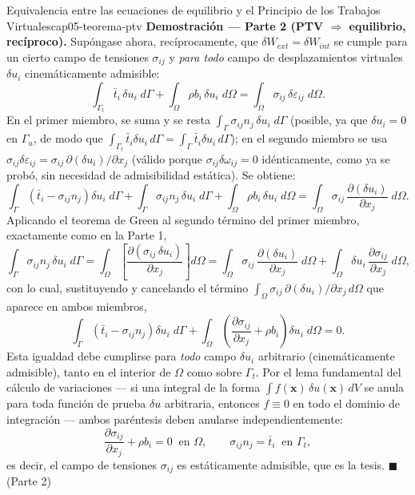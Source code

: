 \begin{teorema}{Equivalencia entre las ecuaciones de equilibrio y el Principio de los Trabajos Virtuales}{cap05-teorema-ptv}
\medskip
\textbf{Demostración --- Parte 2 (PTV $\Rightarrow$ equilibrio, recíproco).}
Supóngase ahora, recíprocamente, que $\delta W_{ext}=\delta W_{int}$ se cumple para un cierto campo de tensiones $\sigma_{ij}$ y \emph{para todo} campo de desplazamientos virtuales $\delta u_i$ cinemáticamente admisible:
\[
\int_{\Gamma_t}\bar t_i\,\delta u_i\;d\Gamma + \int_\Omega \rho b_i\,\delta u_i\;d\Omega = \int_\Omega \sigma_{ij}\,\delta\varepsilon_{ij}\;d\Omega .
\]
En el primer miembro, se suma y se resta $\displaystyle\int_\Gamma \sigma_{ij}n_j\,\delta u_i\;d\Gamma$ (posible, ya que $\delta u_i=0$ en $\Gamma_u$, de modo que $\int_{\Gamma_t}\bar t_i \delta u_i\, d\Gamma = \int_\Gamma \bar t_i \delta u_i\, d\Gamma$); en el segundo miembro se usa $\sigma_{ij}\delta\varepsilon_{ij} = \sigma_{ij}\,\partial(\delta u_i)/\partial x_j$ (válido porque $\sigma_{ij}\delta\omega_{ij}=0$ idénticamente, como ya se probó, sin necesidad de admisibilidad estática). Se obtiene:
\[
\int_\Gamma \left(\bar t_i - \sigma_{ij}n_j\right)\delta u_i\;d\Gamma + \int_\Gamma \sigma_{ij}n_j\,\delta u_i\;d\Gamma + \int_\Omega \rho b_i\,\delta u_i\;d\Omega = \int_\Omega \sigma_{ij}\,\frac{\partial(\delta u_i)}{\partial x_j}\;d\Omega .
\]
Aplicando el teorema de Green al segundo término del primer miembro, exactamente como en la Parte 1,
\[
\int_\Gamma \sigma_{ij}n_j\,\delta u_i\;d\Gamma = \int_\Omega \left[\frac{\partial(\sigma_{ij}\,\delta u_i)}{\partial x_j}\right] d\Omega = \int_\Omega \sigma_{ij}\,\frac{\partial(\delta u_i)}{\partial x_j}\;d\Omega + \int_\Omega \delta u_i\,\frac{\partial \sigma_{ij}}{\partial x_j}\;d\Omega ,
\]
con lo cual, sustituyendo y cancelando el término $\int_\Omega \sigma_{ij}\,\partial(\delta u_i)/\partial x_j\,d\Omega$ que aparece en ambos miembros,
\[
\int_\Gamma \left(\bar t_i - \sigma_{ij}n_j\right)\delta u_i\;d\Gamma + \int_\Omega \left(\frac{\partial \sigma_{ij}}{\partial x_j} + \rho b_i\right)\delta u_i\;d\Omega = 0 .
\]
Esta igualdad debe cumplirse para \emph{todo} campo $\delta u_i$ arbitrario (cinemáticamente admisible), tanto en el interior de $\Omega$ como sobre $\Gamma_t$. Por el lema fundamental del cálculo de variaciones --- si una integral de la forma $\int f(\bm x)\,\delta u(\bm x)\,dV$ se anula para toda función de prueba $\delta u$ arbitraria, entonces $f\equiv0$ en todo el dominio de integración --- ambos paréntesis deben anularse independientemente:
\[
\frac{\partial \sigma_{ij}}{\partial x_j} + \rho b_i = 0 \ \text{ en } \Omega, \qquad \sigma_{ij}n_j = \bar t_i \ \text{ en } \Gamma_t ,
\]
es decir, el campo de tensiones $\sigma_{ij}$ es estáticamente admisible, que es la tesis. \hfill$\blacksquare$ (Parte 2)
\end{teorema}

